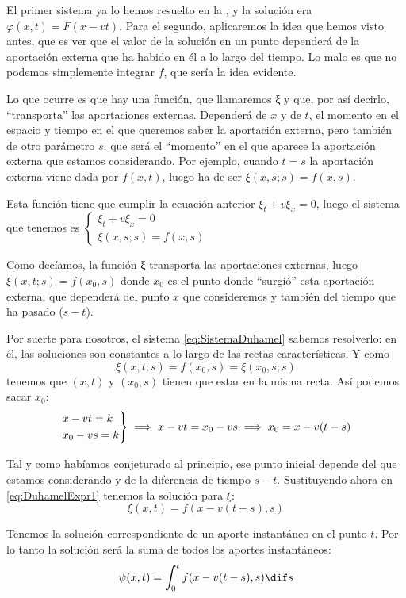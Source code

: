 			El primer sistema ya lo hemos resuelto en la , y la solución era ${φ(x,t) = F(x - vt)}$. Para el segundo, aplicaremos la idea que hemos visto antes, que es ver que el valor de la solución en un punto dependerá de la aportación externa que ha habido en él a lo largo del tiempo. Lo malo es que no podemos simplemente integrar $f$, que sería la idea evidente.

			Lo que ocurre es que hay una función, que llamaremos ξ y que, por así decirlo, ``transporta'' las aportaciones externas. Dependerá de $x$ y de $t$, el momento en el espacio y tiempo en el que queremos saber la aportación externa, pero también de otro parámetro $s$, que será el ``momento'' en el que aparece la aportación externa que estamos considerando. Por ejemplo, cuando $t = s$ la aportación externa viene dada por $f(x,t)$, luego ha de ser $ξ(x,s; s) = f(x,s)$.

			Esta función tiene que cumplir la ecuación anterior $ξ_t + v ξ_x = 0$, luego el sistema que tenemos es \( \begin{cases}
			ξ_t + vξ_x = 0 \\
			ξ(x,s;s) = f(x,s)
			\end{cases} \label{eq:SistemaDuhamel} \)

			Como decíamos, la función ξ transporta las aportaciones externas, luego \( ξ(x,t; s) = f(x_0, s) \label{eq:DuhamelExpr1} \) donde $x_0$ es el punto donde ``surgió'' esta aportación externa, que dependerá del punto $x$ que consideremos y también del tiempo que ha pasado ($s-t$).

			Por suerte para nosotros, el sistema \eqref{eq:SistemaDuhamel} sabemos resolverlo: en él, las soluciones son constantes a lo largo de las rectas características. Y como $$ξ(x,t;s) = f(x_0, s) = ξ(x_0,s;s)$$ tenemos que $(x,t)$ y $(x_0, s)$ tienen que estar en la misma recta. Así podemos sacar $x_0$:
			\[
			\begin{rcases}
				x-vt = k\\
				x_0 - vs = k
			\end{rcases}
			 \implies x-vt = x_0 - vs \implies
			x_0 = x-v(t-s) \]

			Tal y como habíamos conjeturado al principio, ese punto inicial depende del que estamos considerando y de la diferencia de tiempo $s-t$. Sustituyendo ahora en \eqref{eq:DuhamelExpr1} tenemos la solución para $ξ$:
			\[ \xi(x,t) = f(x - v(t-s), s) \]

			Tenemos la solución correspondiente de un aporte instantáneo en el punto $t$. Por lo tanto la solución será la suma de todos los aportes instantáneos:
			\[  \psi(x,t) = \int^{t}_{0} f(x-v(t-s),s) \dif s \]

